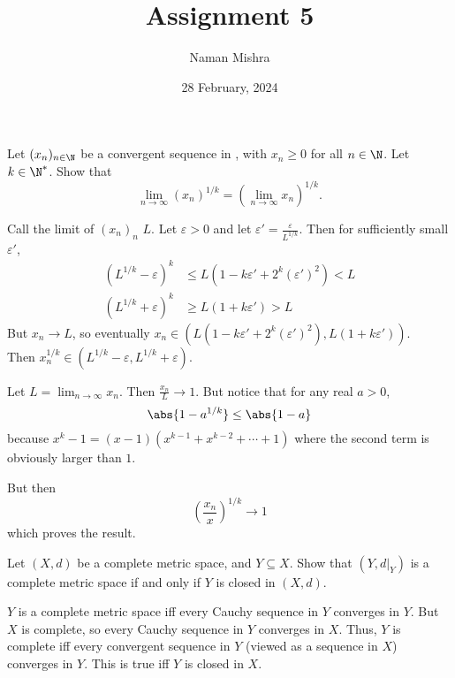 \documentclass[12pt]{article}
\title{Assignment 5} \setcounter{assignment}{5}
\author{Naman Mishra}
\date{28 February, 2024}
\begin{document}
\maketitle
\begin{problem*}
    Let $(x_n)_{n \in \N}$ be a convergent sequence in \R,
    with $x_n \ge 0$ for all $n \in \N$.
    Let $k \in \N^*$.
    Show that \[
        \lim_{n \to \infty} (x_n)^{1/k}
            = \left(\lim_{n \to \infty} x_n\right)^{1/k}.
    \]
\end{problem*}
\begin{solution}
    Call the limit of $(x_n)_n$ $L$.
    Let $\varepsilon > 0$ and let
    $\varepsilon' = \frac{\varepsilon}{L^{1/k}}$.
    Then for sufficiently small $\varepsilon'$, \begin{align*}
        (L^{1/k} - \varepsilon)^k &\le L(1 - k \varepsilon' + 2^k (\varepsilon')^2) < L \\
        (L^{1/k} + \varepsilon)^k &\ge L(1 + k \varepsilon') > L
    \end{align*}
    But $x_n \to L$, so eventually
    $x_n \in (L(1 - k \varepsilon' + 2^k (\varepsilon')^2), L(1 + k \varepsilon'))$. \\
    Then $x_n^{1/k} \in (L^{1/k} - \varepsilon, L^{1/k} + \varepsilon)$.
\end{solution}
\begin{solution}[Alternative]
    Let $L = \lim_{n \to \infty} x_n$.
    Then $\frac{x_n}{L} \to 1$.
    But notice that for any real $a > 0$, \[
        \abs{1 - a^{1 / k}} \le \abs{1 - a}
    \] because $x^k - 1 = (x - 1)(x^{k-1} + x^{k-2} + \cdots + 1)$ where the
    second term is obviously larger than $1$.

    But then \[
        \left(\frac{x_n}{x}\right)^{1/k} \to 1
    \] which proves the result.
\end{solution}

\begin{problem*}
    Let $(X, d)$ be a complete metric space, and $Y \subseteq X$.
    Show that $(Y, d\vert_Y)$ is a complete metric space if and only if
    $Y$ is closed in $(X, d)$.
\end{problem*}
\begin{solution}
    $Y$ is a complete metric space iff every Cauchy sequence in
    $Y$ converges in $Y$.
    But $X$ is complete, so every Cauchy sequence in $Y$ converges in $X$.
    Thus, $Y$ is complete iff every convergent sequence in $Y$ (viewed as a
    sequence in $X$) converges in $Y$.
    This is true iff $Y$ is closed in $X$.
\end{solution}
\end{document}
